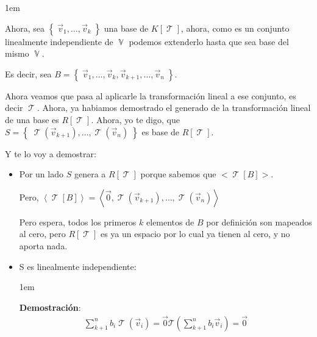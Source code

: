 \documentclass[12pt, fleqn]{report}                             %
\newenvironment{SmallIndentation}[1][0.75em]                    %
        {\begin{adjustwidth}{#1}{}\begin{footnotesize}}             %
        {\end{footnotesize}\end{adjustwidth}}                       %
\theoremstyle{break}                                            %
\DeclareMathOperator \VectorSet    {\mathbb{V}}                 %
\DeclareMathOperator \LinTrans {\mathcal{T}}                    %
\newcommand{\Set}[1]    {\left\{ \; #1 \; \right\}}             %
\newcommand{\Wrap}[1]    {\left( #1 \right)}                    %
\newcommand{\Generate}[1]{\left\langle #1 \right\rangle}        %
\newcommand{\FnLinTrans}[1]{\mathcal{T}\Wrap{#1}}               %
\begin{document}
\begin{itemize}
\begin{SmallIndentation}[1em]
                            Ahora, sea $\Set{\vec v_1, \dots, \vec v_k}$ una base de $K[\LinTrans]$, ahora, como es un conjunto
                            linealmente independiente de $\VectorSet$ podemos extenderlo hasta que sea base del mismo
                            $\VectorSet$.

                            Es decir, sea $B = \Set{\vec v_1, \dots, \vec v_k, \vec v_{k+1}, \dots, \vec v_n}$.

                            Ahora veamos que pasa al aplicarle la transformación lineal a ese conjunto, es
                            decir $\LinTrans$.
                            Ahora, ya habiamos demostrado el generado de la transformación lineal de una base
                            es $R[\LinTrans]$.
                            Ahora, yo te digo, que $S = \Set{ \LinTrans(\vec v_{k+1}), \dots, \LinTrans(\vec v_n)}$
                            es base de $R[\LinTrans]$.

                            Y te lo voy a demostrar:
                            \begin{itemize}
                                \item 
                                    Por un lado $S$ genera a $R[\LinTrans]$ porque sabemos que $<\LinTrans[B]>$.

                                    Pero, 
                                    $\Generate{\LinTrans[B]} 
                                        = \Generate{\vec 0, \LinTrans(\vec v_{k+1}), \dots, \LinTrans(\vec v_n)}$

                                    Pero espera, todos los primeros $k$ elementos de $B$ por definición son mapeados
                                    al cero, pero $R[\LinTrans]$ es ya un espacio por lo cual ya tienen al cero, y no 
                                    aporta nada.

                                \item
                                    S es linealmente independiente:

                                    \begin{SmallIndentation}[1em]
                                        \textbf{Demostración}:
                                        \begin{align*}
                                            \sum_{k+1}^n b_i \LinTrans(\vec v_i) = \vec 0
                                            \FnLinTrans{\sum_{k+1}^n b_i \vec v_i} = \vec 0
                                        \end{align*}


\end{SmallIndentation}
\end{itemize}
\end{SmallIndentation}
\end{itemize}
\end{document}
